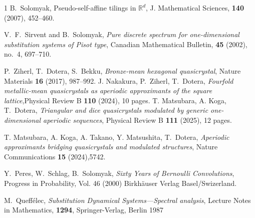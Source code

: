 \documentclass[a4]{amsart}
\theoremstyle{definition}
\begin{document}
\begin{thebibliography}{1}
B.~Solomyak, Pseudo-self-affine tilings in $\mathbb{R}^d$, J. Mathematical Sciences, \textbf{140}
(2007), 452--460.

V.~F.~Sirvent and B.~Solomyak, \emph{Pure discrete spectrum for one-dimensional substitution systems of Pisot type}, Canadian Mathematical Bulletin, \textbf{45} (2002), no.~4, 697--710.


P.~Ziherl, T.~Dotera, S.~Bekku, \emph{Bronze-mean hexagonal quasicrystal},
  Nature Materials \textbf{16} (2017), 987--992.
J. Nakakura, P.~Ziherl, T.~Dotera, \emph{Fourfold metallic-mean quasicrystals as aperiodic approximants of the square lattice},Physical Review B \textbf{110} (2024), 10 pages.
T. Matsubara, A. Koga, T.~Dotera, \emph{Triangular and dice quasicrystals modulated by generic one-dimensional aperiodic sequences}, Physical Review B \textbf{111} (2025), 12 pages.

T. Matsubara, A. Koga, A. Takano, Y. Matsushita, T.~Dotera, \emph{Aperiodic approximants bridging quasicrystals and modulated structures}, Nature Communications \textbf{15} (2024),5742.

Y.~Peres, W.~Schlag, B.~Solomyak,
\emph{
Sixty Years of Bernoulli Convolutions},
Progress in Probability, Vol. 46 (2000)
Birkh{\"a}user Verlag Basel/Swizerland.

M.~Queff{\'e}lec,
\emph{Substitution {D}ynamical {S}ystems---{S}pectral analysis},
Lecture Notes in Mathematics, \textbf{1294}, Springer-Verlag, Berlin 1987


\end{thebibliography}
\end{document}

